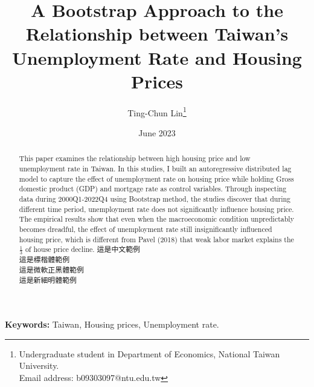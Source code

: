 \documentclass[12pt]{article}
\title{ A Bootstrap Approach to the Relationship between Taiwan's Unemployment Rate and Housing Prices }
\author{Ting-Chun Lin\thanks{
Undergraduate student in Department of Economics, National Taiwan University.\\ 
Email address: b09303097@ntu.edu.tw
}
}
\date{June 2023}
\begin{document}
\maketitle
\begin{abstract}{
    This paper examines the relationship between high housing price and low unemployment rate in Taiwan. In this studies, I built an autoregressive distributed lag model to capture the effect of unemployment rate on housing price while holding Gross domestic product (GDP) and mortgage rate as control variables. Through inspecting data during 2000Q1-2022Q4 using Bootstrap method, the studies discover that during different time period, unemployment rate does not significantly influence housing price. The empirical results show that even when the macroeconomic condition unpredictably becomes dreadful, the effect of unemployment rate still insignificantly influenced housing price, which is different from Pavel (2018) that weak labor market explains the $\frac{1}{3}$ of house price decline.
    這是中文範例 \\
    \Kai 這是標楷體範例 \\
    \Hei 這是微軟正黑體範例 \\
    \NewMing 這是新細明體範例
}
\end{abstract}
\textbf{Keywords:} Taiwan, Housing prices, Unemployment rate.
\newpage
\end{document}
